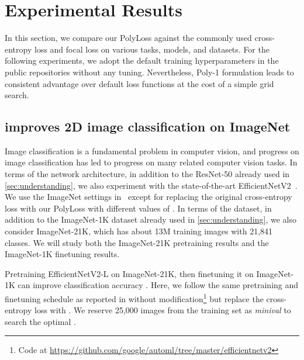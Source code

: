 \vspace{-5pt}
\section{Experimental Results}
\vspace{-5pt}

In this section, we compare our PolyLoss against the commonly used cross-entropy loss and focal loss on various tasks, models, and datasets. For the following experiments, we adopt the default training hyperparameters in the public repositories without any tuning. Nevertheless, Poly-1 formulation leads to consistent advantage over default loss functions at the cost of a simple grid search.

\vspace{-5pt}
\subsection{\texorpdfstring{}{} improves 2D image classification on ImageNet}
\vspace{-5pt}

Image classification is a fundamental problem in computer vision, and progress on image classification has led to progress on many related computer vision tasks. 
In terms of the network architecture, in addition to the ResNet-50 already used in \autoref{sec:understanding}, we also experiment with the state-of-the-art EfficientNetV2~\citep{tan2021efficientnetv2}. 
We use the ImageNet settings in~\citep{tan2021efficientnetv2} except for replacing the original cross-entropy loss with our PolyLoss  with different values of .
In terms of the dataset, in addition to the ImageNet-1K dataset already used in \autoref{sec:understanding}, we also consider ImageNet-21K, which has about 13M training images with 21,841 classes. We will study both the ImageNet-21K pretraining results and the ImageNet-1K finetuning results.





Pretraining EfficientNetV2-L on ImageNet-21K, then finetuning it on ImageNet-1K can improve classification accuracy \citep{tan2021efficientnetv2}. Here, we follow the same pretraining and finetuning schedule as reported in \citet{tan2021efficientnetv2} without modification\footnote{\label{note:enet} Code at \url{https://github.com/google/automl/tree/master/efficientnetv2}} but replace the cross-entropy loss with . We reserve 25,000 images from the training set as \textit{minival} to search the optimal .

